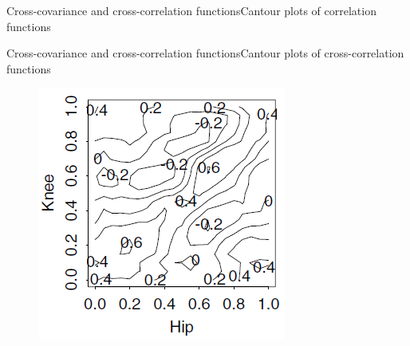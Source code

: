 \documentclass{beamer}
\begin{document}
\begin{frame}{Cross-covariance and cross-correlation functions}{Cantour plots of correlation functions}
\begin{multicols}{2}
\begin{figure}[h]
\begin{center}
			\end{center}
			\label{fig:long}
			\label{fig:onecol}
		\end{figure}
	\end{multicols}
\end{frame}

\begin{frame}{Cross-covariance and cross-correlation functions}{Cantour plots of cross-correlation functions}
\begin{multicols}{2}
	\begin{figure}[h] %
		\begin{center}
			\includegraphics[width=0.9\linewidth]{img/8.png}
		\end{center}
		\label{fig:long}
		\label{fig:onecol}
	\end{figure}
	\begin{figure}[h] %
		\begin{center}

\end{center}
\end{figure}
\end{multicols}
\end{frame}
\end{document}
